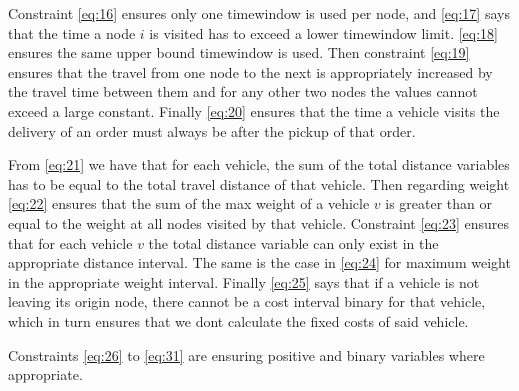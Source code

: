\documentclass[../main.tex]{subfiles}
\begin{document}
Constraint \ref{eq:16} ensures only one timewindow is used per node, and \ref{eq:17} says that the time a node $i$ is visited has to exceed a lower timewindow limit.
\ref{eq:18} ensures the same upper bound timewindow is used. 
Then constraint \ref{eq:19} ensures that the travel from one node to the next is appropriately increased by the travel time between them and for any other two nodes the values cannot exceed a large constant.
Finally \ref{eq:20} ensures that the time a vehicle visits the delivery of an order must always be after the pickup of that order. \par

From \ref{eq:21} we have that for each vehicle, the sum of the total distance variables has to be equal to the total travel distance of that vehicle.
Then regarding weight \ref{eq:22} ensures that the sum of the max weight of a vehicle $v$ is greater than or equal to the weight at all nodes visited by that vehicle.
Constraint \ref{eq:23} ensures that for each vehicle $v$ the total distance variable can only exist in the appropriate distance interval.
The same is the case in \ref{eq:24} for maximum weight in the appropriate weight interval.
Finally \ref{eq:25} says that if a vehicle is not leaving its origin node, there cannot be a cost interval binary for that vehicle, which in turn ensures that we dont calculate the fixed costs of said vehicle. \par
Constraints \ref{eq:26} to \ref{eq:31} are ensuring positive and binary variables where appropriate.  \par


\biblio                                                         
\end{document}
